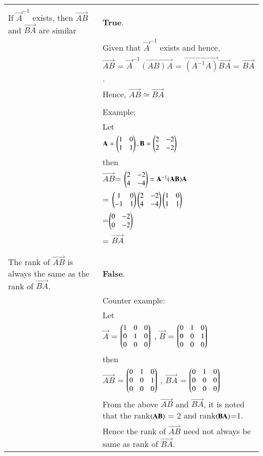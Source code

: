 \documentclass[journal,12pt,twocolumn]{IEEEtran}
\begin{document}
\begin{table}[h]
	\begin{tabular}{|m{3cm}|m{14cm}|}
		\hline
		&\\
	    If $\vec{A}^{-1}$ exists, then $\vec{AB}$ and $\vec{BA}$ are similar
		& \textbf{True}. \\
		& Given that $\vec{A}^{-1}$ exists and hence,\\
		&\qquad\qquad\qquad $\vec{AB}$ = $\vec{A}^{-1}\vec{(AB)A}$ =  $\vec{(A^{-1}A)}\vec{BA}$ = $\vec{BA}$.\\
		& Hence, $\vec{AB} \simeq \vec{BA}$ \\
		&\\
		&Example:\\
		& Let\\
		& \qquad\qquad\qquad$\mathbf{A} = \begin{pmatrix}1 & 0 \\ 1 & 1\end{pmatrix}, \mathbf{B} = \begin{pmatrix}2 & -2 \\ 2 & -2\end{pmatrix}$\\
		&then\\
		& \qquad\qquad\qquad$\vec{AB}$\quad= $\begin{pmatrix}2 & -2 \\ 4 & -4\end{pmatrix} = \mathbf{A}^{-1} (\mathbf{AB})\mathbf{A}$\\
		&  \qquad\qquad\qquad  \qquad\qquad\qquad\quad= $\begin{pmatrix}1 & 0\\ -1 & 1\end{pmatrix}\begin{pmatrix}2 & -2 \\ 4 & -4\end{pmatrix}\begin{pmatrix}1 & 0 \\ 1 & 1\end{pmatrix}$\\
		&  \qquad\qquad\qquad \qquad\qquad\qquad\quad=$\begin{pmatrix}0 & -2 \\ 0 & -2\end{pmatrix} $\\
		&  \qquad\qquad\qquad \qquad\qquad\qquad\quad= $\vec{BA}$\\
		&\\
		\hline
		&\\
	    The rank of $\vec{AB}$  is always the same as the rank of $\vec{BA}$.
		& \textbf{False}. \\
		&Counter example:\\
		& Let\\
		& \qquad\qquad\qquad$\vec{A}$ = $\begin{pmatrix}1 & 0 & 0 \\ 0 &1 & 0\\ 0 & 0 & 0\end{pmatrix}$ , 
		$\vec{B}$ = $\begin{pmatrix}0& 1 & 0 \\ 0 & 0 & 1\\ 0 & 0 & 0\end{pmatrix}$\\
		&then\\
		& \qquad\qquad\qquad$\vec{AB}$ = $\begin{pmatrix}0 & 1 & 0 \\ 0 & 0 & 1\\ 0 & 0 & 0\end{pmatrix}$ ,  $\vec{BA}$ = $\begin{pmatrix}0 & 1  & 0\\ 0 & 0 & 0\\ 0 & 0 & 0\end{pmatrix}$\\
		& From the above $\vec{AB}$ and $\vec{BA}$, it is noted that the rank$\left(\mathbf{AB}\right)$ = 2 and rank$\left(\mathbf{BA}\right)$=1. \\
		& Hence the rank of $\vec{AB}$ need not always be same as rank of $\vec{BA}$.
		\\
		\hline
	\end{tabular}
\end{table}
\end{document}
